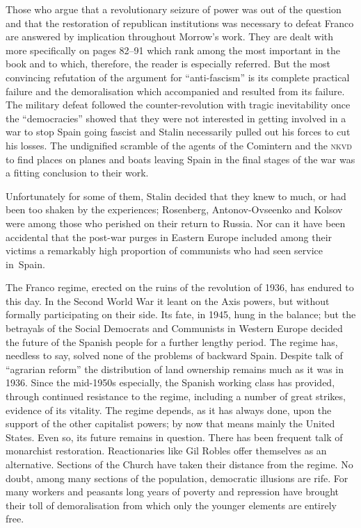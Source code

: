 Those who argue that a revolutionary seizure of power was out of the question and that the restoration of republican institutions was necessary to defeat Franco are answered by implication throughout Morrow’s work. They are dealt with more specifically on pages 82--91 which rank among the most important in the book and to which, therefore, the reader is especially referred. But the most convincing refutation of the argument for ``anti-fascism'' is its complete practical failure and the demoralisation which accompanied and resulted from its failure. The military defeat followed the counter-revolution with tragic inevitability once the ``democracies'' showed that they were not interested in getting involved in a war to stop Spain going fascist and Stalin necessarily pulled out his forces to cut his losses. The undignified scramble of the agents of the Comintern and the \textsc{nkvd} to find places on planes and boats leaving Spain in the final stages of the war was a fitting conclusion to their work. 

Unfortunately for some of them, Stalin decided that they knew to much, or had been too shaken by the experiences; Rosenberg, Antonov-Ovseenko and Kolsov were among those who perished on their return to Russia. Nor can it have been accidental that the post-war purges in Eastern Europe included among their victims a remarkably high proportion of communists who had seen service in~Spain.

The Franco regime, erected on the ruins of the revolution of 1936, has endured to this day. In the Second World War it leant on the Axis powers, but without formally participating on their side. Its fate, in 1945, hung in the balance; but the betrayals of the Social Democrats and Communists in Western Europe decided the future of the Spanish people for a further lengthy period. The regime has, needless to say, solved none of the problems of backward Spain. Despite talk of ``agrarian reform'' the distribution of land ownership remains much as it was in 1936. Since the mid-1950s especially, the Spanish working class has provided, through continued resistance to the regime, including a number of great strikes, evidence of its vitality. The regime depends, as it has always done, upon the support of the other capitalist powers; by now that means mainly the United States. Even so, its future remains in question. There has been frequent talk of monarchist restoration. Reactionaries like Gil Robles{\indexGRobles} offer themselves as an alternative. Sections of the Church have taken their distance from the regime. No doubt, among many sections of the population, democratic illusions are rife. For many workers and peasants long years of poverty and repression have brought their toll of demoralisation from which only the younger elements are entirely free.

